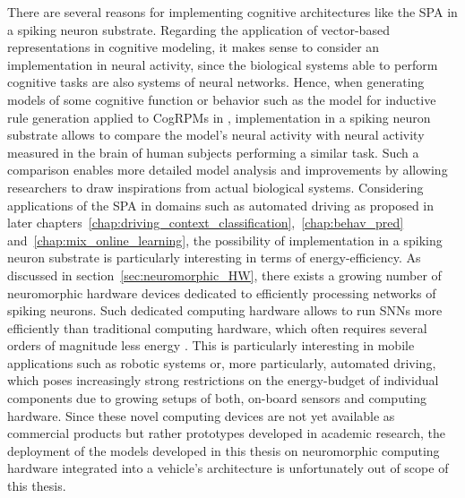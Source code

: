 There are several reasons for implementing cognitive architectures like the \ac{SPA} in a spiking neuron substrate.
Regarding the application of vector-based representations in cognitive modeling, it makes sense to consider an implementation in neural activity, since the biological systems able to perform cognitive tasks are also systems of neural networks.
Hence, when generating models of some cognitive function or behavior such as the model for inductive rule generation applied to \acp{CogRPM} in \textcite{Rasmussen2011}, implementation in a spiking neuron substrate allows to compare the model's neural activity with neural activity measured in the brain of human subjects performing a similar task.
Such a comparison enables more detailed model analysis and improvements by allowing researchers to draw inspirations from actual biological systems.
Considering applications of the \ac{SPA} in domains such as automated driving as proposed in later chapters~\ref{chap:driving_context_classification},~\ref{chap:behav_pred} and~\ref{chap:mix_online_learning}, the possibility of implementation in a spiking neuron substrate is particularly interesting in terms of energy-efficiency.
As discussed in section~\ref{sec:neuromorphic_HW}, there exists a growing number of neuromorphic hardware devices dedicated to efficiently processing networks of spiking neurons.
Such dedicated computing hardware allows to run \acp{SNN} more efficiently than traditional computing hardware, which often requires several orders of magnitude less energy \parencite{Hunsberger2016}.
This is particularly interesting in mobile applications such as robotic systems or, more particularly, automated driving, which poses increasingly strong restrictions on the energy-budget of individual components due to growing setups of both, on-board sensors and computing hardware.
Since these novel computing devices are not yet available as commercial products but rather prototypes developed in academic research, the deployment of the models developed in this thesis on neuromorphic computing hardware integrated into a vehicle's architecture is unfortunately out of scope of this thesis. 

